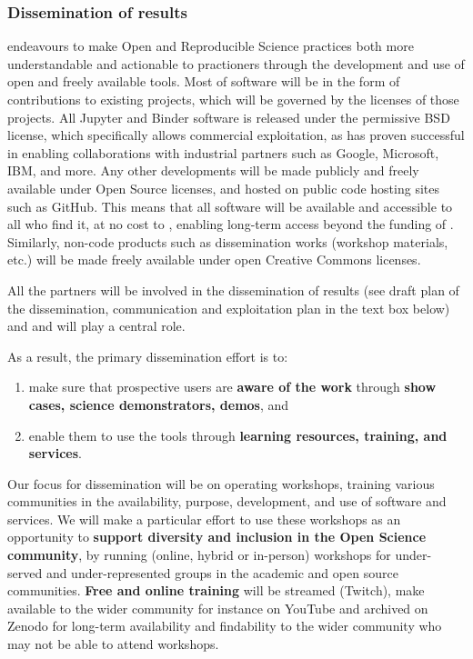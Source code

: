\subsubsection{Dissemination of results}

 \TheProject endeavours to make Open and Reproducible Science practices both more understandable and actionable
 to practioners through the development and use of open and freely available tools.
Most of \TheProject software will be in the form of contributions to existing projects,
which will be governed by the licenses of those projects.
All Jupyter and Binder software is released under the permissive BSD license,
which specifically allows commercial exploitation,
as has proven successful in enabling collaborations with industrial partners
such as Google, Microsoft, IBM, and more.
Any other developments will  be made publicly and freely available under Open Source licenses, and
hosted on public code hosting sites such as GitHub.
This means that all \TheProject software will be available and accessible to all who find it,
at no cost to \TheProject,
enabling long-term access beyond the funding of \TheProject.
Similarly, non-code products such as dissemination works
(workshop materials, etc.) will be made freely available under open Creative Commons licenses.


All the partners will be involved in the dissemination of \TheProject results (see draft plan of the
dissemination, communication and exploitation plan in the text box below) and
 and  will play a central role.

As a result, the primary dissemination effort is to:

\begin{enumerate}
  \item make sure that prospective users are \textbf{aware of the work} through \textbf{show cases, science demonstrators, demos}, and
  \item enable them to use the tools through \textbf{learning resources, training, and services}.
\end{enumerate}

Our focus for dissemination will be on
operating workshops, training various communities in the availability,
purpose, development, and use of \TheProject software and services.
We will make a particular effort to use these workshops as an opportunity
to \textbf{support diversity and inclusion in the Open Science community},
by running (online, hybrid or in-person) workshops for under-served and under-represented groups in the academic and
open source communities. \textbf{Free and online training} will be streamed (Twitch),
 make available to the wider community for instance on YouTube and archived on Zenodo for long-term availability and
 findability to the wider community who may not be able to attend workshops.


